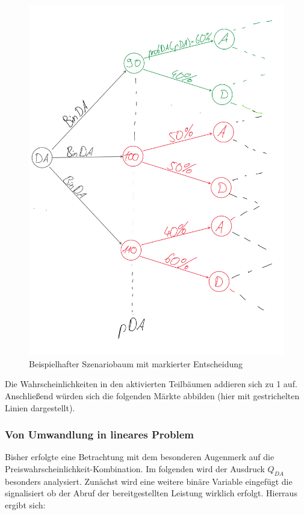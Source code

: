 \documentclass{article}
\begin{document}
\begin{figure}[H]

    \includegraphics[width=1\linewidth]{pictures/szBaumBeispiel_markiert.png}
    \caption{Beispielhafter Szenariobaum mit markierter Entscheidung}
    \label{fig:enter-label}
\end{figure}

Die Wahrscheinlichkeiten in den aktivierten Teilbäumen addieren sich zu 1 auf.
Anschließend würden sich die folgenden Märkte abbilden (hier mit gestrichelten Linien dargestellt).\\

\subsubsection{Von Umwandlung in lineares Problem}
Bisher erfolgte eine Betrachtung mit dem besonderen Augenmerk auf die Preiswahrscheinlichkeit-Kombination.
Im folgenden wird der Ausdruck $Q_{DA}$ besonders analysiert. Zunächst wird eine weitere binäre Variable eingefügt die signalisiert ob der Abruf der bereitgestellten Leistung wirklich erfolgt.
Hierraus ergibt sich:
\end{document}
